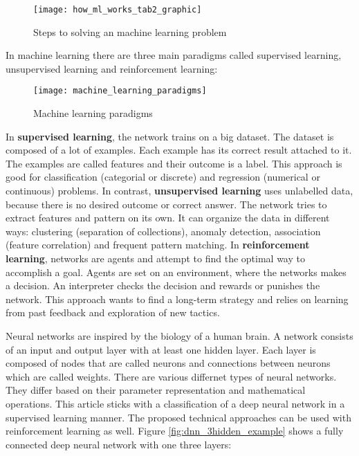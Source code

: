 \begin{figure}[H]
    \centering
    \texttt{[image: how\_ml\_works\_tab2\_graphic]}
    \caption{\cite{tf_ml_steps_pipline} Steps to solving an machine learning problem}
    \label{fig:ml_steps_pipeline}
\end{figure}

In machine learning there are three main paradigms called supervised learning, unsupervised learning and reinforcement learning:

\begin{figure}[H]
    \centering
    \texttt{[image: machine\_learning\_paradigms]}
    \caption{\cite{ml_paradigms_image} Machine learning paradigms}
    \label{fig:ml_paradigms_image}
\end{figure}

In \textbf{supervised learning}, the network trains on a big dataset.
The dataset is composed of a lot of examples.
Each example has its correct result attached to it.
The examples are called features and their outcome is a label.
This approach is good for classification (categorial or discrete) and regression (numerical or continuous) problems.
\cite{nvidia_paradigms_blog}
\hfill \break
In contrast, \textbf{unsupervised learning} uses unlabelled data, because there is no desired outcome or correct answer.
The network tries to extract features and pattern on its own.
It can organize the data in different ways: clustering (separation of collections), anomaly detection, association
(feature correlation) and frequent pattern matching.
\cite{nvidia_paradigms_blog}
\hfill \break
In \textbf{reinforcement learning}, networks are agents and attempt to find the optimal way to accomplish a goal.
Agents are set on an environment, where the networks makes a decision.
An interpreter checks the decision and rewards or punishes the network.
This approach wants to find a long-term strategy and relies on learning from past feedback and exploration of new tactics.
\cite{nvidia_paradigms_blog}

Neural networks are inspired by the biology of a human brain.
A network consists of an input and output layer with at least one hidden layer.
Each layer is composed of nodes that are called neurons and connections between neurons which are called weights.
There are various differnet types of neural networks.
They differ based on their parameter representation and mathematical operations.
This article sticks with a classification of a deep neural network in a supervised learning manner.
The proposed technical approaches can be used with reinforcement learning as well.
Figure \ref{fig:dnn_3hidden_example} shows a fully connected deep neural network with one three layers:
\cite{nvidia-ai-explained, tensorflow-about}

